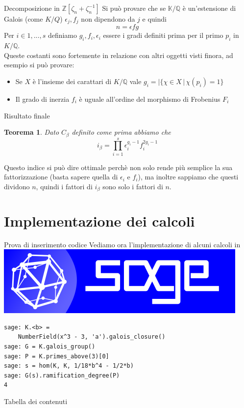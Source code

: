 \documentclass{beamer}
\theoremstyle{plain}
\newtheorem{teo}{Teorema}[section]
\theoremstyle{remark}
\theoremstyle{definition}
\newcommand{\sage}{\href{https://www.sagemath.org}{\includegraphics[height=\fontcharht\font`\B]{images/sage.png} }}
\newcommand{\Z}{\mathbb{Z}}
\newcommand{\K}{\mathbb{K}}
\newcommand{\Q}{\mathbb{Q}}
\begin{document}
	\begin{frame}{Decomposizione in $ \Z [\zeta_n + \zeta_n^{-1}] $}
		Si può provare che se $ \K / \Q $ è un'estensione di Galois (come $ K / Q $) $ \epsilon _j, f_j $ non dipendono da $ j $ e quindi \[ n = \epsilon fg \] \pause
		Per $ i\in {1 , ... , s} $ definiamo $ g_i , f_i , \epsilon _i $ essere i gradi definiti prima per il primo $ p_i$ in $ K /\Q $.\\
		\pause
		Queste costanti sono fortemente in relazione con altri oggetti visti finora, ad esempio si può provare:
		\begin{itemize}
		\item Se $ X $ è l'insieme dei carattari di $ K / \Q $ vale $ g_i = | \{ \chi \in X \,|\, \chi(p_i)=1 \} $
		\item Il grado di inerzia $ f_i $ è uguale all'ordine del morphismo di Frobenius $ F_i $
		\end{itemize}
	\end{frame}
	
	\begin{frame}{Risultato finale}
		\begin{teo} \label{teo:idx_opt}
					Dato $ C_\beta $ definito come prima abbiamo che
					\[ i_\beta  =  \prod_{i=1}^s \epsilon _i^{g_i - 1} f_i ^{2 g_i - 1}\]
		\end{teo}
		\pause
		Questo indice si può dire ottimale perchè non solo rende più semplice la sua fattorizzazione (basta sapere quella di $ \epsilon _i $ e $ f_i $), ma inoltre sappiamo che questi dividono $ n $, quindi i fattori di $i_\beta $ sono solo i fattori di $ n $.
	\end{frame}

	\section{Implementazione dei calcoli}
	
\begin{frame}[fragile]{Prova di inserimento codice}
Vediamo ora l'implementazione di alcuni calcoli in \sage

\begin{lstlisting}
sage: K.<b> = 
	NumberField(x^3 - 3, 'a').galois_closure()
sage: G = K.galois_group()
sage: P = K.primes_above(3)[0]
sage: s = hom(K, K, 1/18*b^4 - 1/2*b)
sage: G(s).ramification_degree(P)
4
\end{lstlisting}		
\end{frame}



	\begin{frame}{Tabella dei contenuti}
		\tableofcontents
	\end{frame}
	
	

	
	
	
	
	
\end{document}
